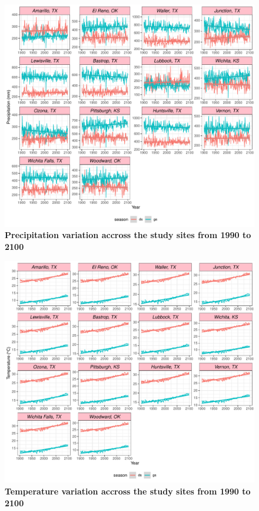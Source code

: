 \documentclass[12pt]{article}
\begin{document}
\begin{figure}[h!]
		\centering
		\includegraphics[width=0.95\linewidth]{Figures/fig_pr_past_present_future.pdf}
		\caption{\textbf{Precipitation variation accross the study sites from 1990 to 2100}}
		\label{Sup:pr_variation}
\end{figure}


\begin{figure}[h!]
		\centering
		\includegraphics[width=0.95\linewidth]{Figures/fig_tas_past_present_future.pdf}
		\caption{\textbf{Temperature variation accross the study sites from 1990 to 2100}}
		\label{Sup:temp_variation}
\end{figure}
\end{document}
